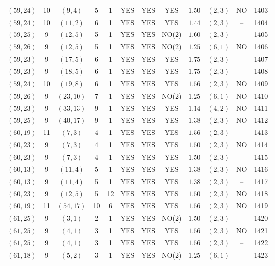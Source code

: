 \begin{longtable}{|c|c|c|c|c|c|c|c|c|c|c|c|}
$(59,24)$ & 10 & $(9,4)$ & 5 & 1 & YES & YES & YES & $1.50$ & $(2,3)$ & NO & 1403\\
$(59,24)$ & 10 & $(11,2)$ & 6 & 1 & YES & YES & YES & $1.44$ & $(2,3)$ & -- & 1404\\
$(59,25)$ & 9 & $(12,5)$ & 5 & 1 & YES & YES & NO(2) & $1.60$ & $(2,3)$ & -- & 1405\\
$(59,26)$ & 9 & $(12,5)$ & 5 & 1 & YES & YES & NO(2) & $1.25$ & $(6,1)$ & NO & 1406\\
$(59,23)$ & 9 & $(17,5)$ & 6 & 1 & YES & YES & YES & $1.75$ & $(2,3)$ & -- & 1407\\
$(59,23)$ & 9 & $(18,5)$ & 6 & 1 & YES & YES & YES & $1.75$ & $(2,3)$ & -- & 1408\\
$(59,24)$ & 10 & $(19,8)$ & 6 & 1 & YES & YES & YES & $1.56$ & $(2,3)$ & NO & 1409\\
$(59,26)$ & 9 & $(23,10)$ & 7 & 1 & YES & YES & NO(2) & $1.25$ & $(6,1)$ & NO & 1410\\
$(59,23)$ & 9 & $(33,13)$ & 9 & 1 & YES & YES & YES & $1.14$ & $(4,2)$ & NO & 1411\\
$(59,25)$ & 9 & $(40,17)$ & 9 & 1 & YES & YES & YES & $1.38$ & $(2,3)$ & NO & 1412\\
$(60,19)$ & 11 & $(7,3)$ & 4 & 1 & YES & YES & YES & $1.56$ & $(2,3)$ & -- & 1413\\
$(60,23)$ & 9 & $(7,3)$ & 4 & 1 & YES & YES & YES & $1.50$ & $(2,3)$ & NO & 1414\\
$(60,23)$ & 9 & $(7,3)$ & 4 & 1 & YES & YES & YES & $1.50$ & $(2,3)$ & -- & 1415\\
$(60,13)$ & 9 & $(11,4)$ & 5 & 1 & YES & YES & YES & $1.38$ & $(2,3)$ & NO & 1416\\
$(60,13)$ & 9 & $(11,4)$ & 5 & 1 & YES & YES & YES & $1.38$ & $(2,3)$ & -- & 1417\\
$(60,23)$ & 9 & $(12,5)$ & 5 & 12 & YES & YES & YES & $1.50$ & $(2,3)$ & NO & 1418\\
$(60,19)$ & 11 & $(54,17)$ & 10 & 6 & YES & YES & YES & $1.56$ & $(2,3)$ & NO & 1419\\
$(61,25)$ & 9 & $(3,1)$ & 2 & 1 & YES & YES & NO(2) & $1.50$ & $(2,3)$ & -- & 1420\\
$(61,25)$ & 9 & $(4,1)$ & 3 & 1 & YES & YES & YES & $1.56$ & $(2,3)$ & NO & 1421\\
$(61,25)$ & 9 & $(4,1)$ & 3 & 1 & YES & YES & YES & $1.56$ & $(2,3)$ & -- & 1422\\
$(61,18)$ & 9 & $(5,2)$ & 3 & 1 & YES & YES & NO(2) & $1.25$ & $(6,1)$ & -- & 1423\\

\end{longtable}
